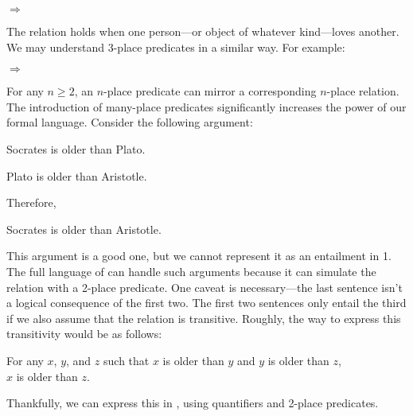 \begin{menumerate}
		\item {} $\Rightarrow$ 
\end{menumerate}

\noindent{}The  relation holds when one person---or object of whatever kind---loves another.  We may understand 3-place predicates in a similar way.  For example:

\begin{menumerate}
	\item {} $\Rightarrow$ 
\end{menumerate}

For any $n\geq2$, an $n$-place predicate can mirror a corresponding $n$-place relation.  The introduction of many-place predicates significantly increases the power of our formal language.  Consider the following argument:

\begin{menumerate}
\item Socrates is older than Plato.
\item Plato is older than Aristotle.

Therefore,

\item Socrates is older than Aristotle.
\end{menumerate}

\noindent{}This argument is a good one, but we cannot represent it as an entailment in \GQL{}1.  The full language of \GQL{} can handle such arguments because it can simulate the  relation with a 2-place predicate.  One caveat is necessary---the last sentence isn't a logical consequence of the first two.  The first two sentences only entail the third if we also assume that the  relation is transitive.  Roughly, the way to express this transitivity would be as follows:

\begin{center}
For any $x$, $y$, and $z$ such that $x$ is older than $y$ and $y$ is older than $z$, \\ $x$ is older than $z$.
\end{center}

\noindent{}Thankfully, we can express this in \GQL{}, using quantifiers and 2-place predicates.

